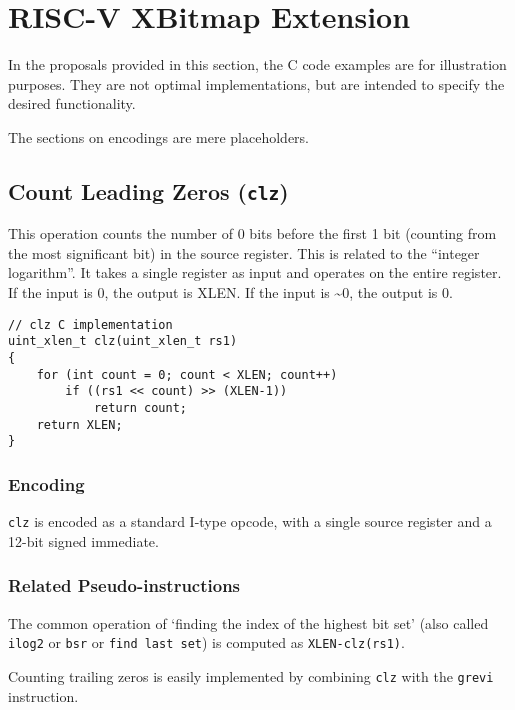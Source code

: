 \chapter{RISC-V XBitmap Extension}\label{risc-v-b-hardware-instructions}

In the proposals provided in this section, the C code examples are for
illustration purposes. They are not optimal implementations, but are
intended to specify the desired functionality.

The sections on encodings are mere placeholders.


\section{Count Leading Zeros (\texttt{clz})}

This operation counts the number of 0 bits before the first 1 bit
(counting from the most significant bit) in the source register. This is
related to the ``integer logarithm''. It takes a single register as
input and operates on the entire register. If the input is 0, the output is
XLEN. If the input is \textasciitilde{}0, the output is 0.

\begin{verbatim}
// clz C implementation
uint_xlen_t clz(uint_xlen_t rs1)
{
    for (int count = 0; count < XLEN; count++)
        if ((rs1 << count) >> (XLEN-1))
            return count;
    return XLEN;
}
\end{verbatim}

\subsection{Encoding}



\texttt{clz} is encoded as a standard I-type opcode, with a single
source register and a 12-bit signed immediate.

\subsection{Related Pseudo-instructions}

The common operation of `finding the index of the highest bit set' (also called
\texttt{ilog2} or \texttt{bsr} or \texttt{find\ last\ set}) is computed as
\texttt{XLEN-clz(rs1)}.

Counting trailing zeros is easily implemented by combining \texttt{clz} with
the \texttt{grevi} instruction.

